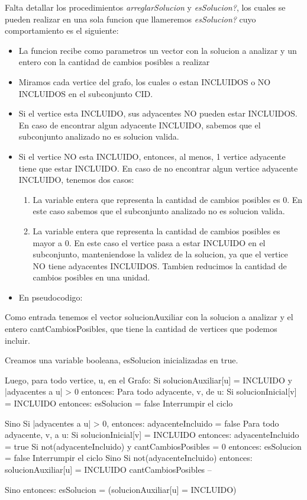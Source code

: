 Falta detallar los procedimientos \textit{arreglarSolucion} y \textit{esSolucion?}, los cuales se pueden realizar en una sola funcion que llameremos \textit{esSolucion?} cuyo comportamiento es el siguiente:
\begin{itemize}
	\item La funcion recibe como parametros un vector con la solucion a analizar y un entero con la cantidad de cambios posibles a realizar
	\item Miramos cada vertice del grafo, los cuales o estan INCLUIDOS o NO INCLUIDOS en el subconjunto CID.
    \item Si el vertice esta INCLUIDO, sus adyacentes NO pueden estar INCLUIDOS. En caso de encontrar algun adyacente INCLUIDO, sabemos que el subconjunto analizado no es solucion valida.
    \item Si el vertice NO esta INCLUIDO, entonces, al menos, 1 vertice adyacente tiene que estar INCLUIDO. En caso de no encontrar algun vertice adyacente INCLUIDO, tenemos dos casos:
    \begin{enumerate}
    	\item La variable entera que representa la cantidad de cambios posibles es 0. En este caso sabemos que el subconjunto analizado no es solucion valida.
        \item La variable entera que representa la cantidad de cambios posibles es mayor a 0. En este caso el vertice pasa a estar INCLUIDO en el subconjunto, manteniendose la validez de la solucion, ya que el vertice NO tiene adyacentes INCLUIDOS. Tambien reducimos la cantidad de cambios posibles en una unidad.
    \end{enumerate} 
    
    \item En pseudocodigo:
    
\end{itemize}

\begin{codesnippet}
Como entrada tenemos el vector solucionAuxiliar con la solucion a analizar y el entero 
cantCambiosPosibles, que tiene la cantidad de vertices que podemos incluir.

Creamos una variable booleana, esSolucion inicializadas en true.

Luego, para todo vertice, u, en el Grafo:
  Si solucionAuxiliar[u] = INCLUIDO y |adyacentes a u| > 0 entonces:
     Para todo adyacente, v, de u:
         Si solucionInicial[v] = INCLUIDO entonces:
             esSolucion = false
             Interrumpir el ciclo
             
  Sino Si |adyacentes a u| > 0, entonces:
       adyacenteIncluido = false
       Para todo adyacente, v, a u:
          Si solucionInicial[v] = INCLUIDO entonces:
             adyacenteIncluido = true
       Si not(adyacenteIncluido) y cantCambiosPosibles = 0 entonces:
         esSolucion = false
         Interrumpir el ciclo
       Sino Si not(adyacenteIncluido) entonces:
         solucionAuxiliar[u] = INCLUIDO
         cantCambiosPosibles --
  
  Sino entonces:
       esSolucion = (solucionAuxiliar[u] = INCLUIDO)
              
\end{codesnippet}

